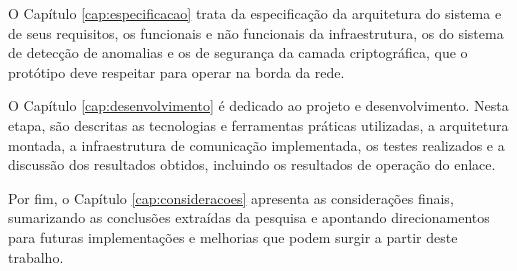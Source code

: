 O Capítulo \ref{cap:especificacao} trata da especificação da arquitetura do sistema e de seus requisitos, os funcionais e não funcionais da infraestrutura, os do sistema de detecção de anomalias e os de segurança da camada criptográfica, que o protótipo deve respeitar para operar na borda da rede.

O Capítulo \ref{cap:desenvolvimento} é dedicado ao projeto e desenvolvimento. Nesta etapa, são descritas as tecnologias e ferramentas práticas utilizadas, a arquitetura montada, a infraestrutura de comunicação implementada, os testes realizados e a discussão dos resultados obtidos, incluindo os resultados de operação do enlace.

Por fim, o Capítulo \ref{cap:consideracoes} apresenta as considerações finais, sumarizando as conclusões extraídas da pesquisa e apontando direcionamentos para futuras implementações e melhorias que podem surgir a partir deste trabalho.
